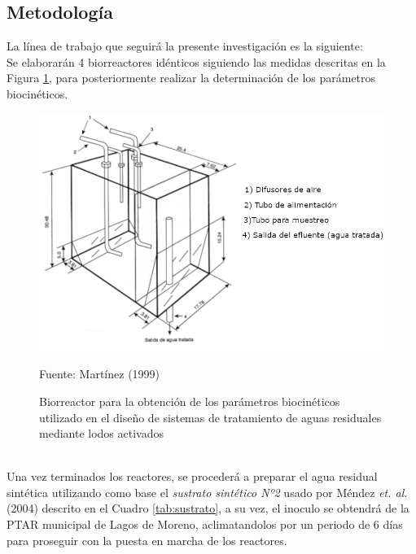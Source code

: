 \subsection*{Metodología}
La línea de trabajo que seguirá la presente investigación es la siguiente:\\
Se elaborarán 4 biorreactores idénticos siguiendo las medidas descritas en la Figura \ref{fig:reactor}, para posteriormente realizar la determinación de los parámetros biocinéticos.
\begin{figure}[!h]
	\centering
	\includegraphics[scale=0.3]{Reactor.png}
	\caption{Biorreactor para la obtención de los parámetros biocinéticos utilizado en el diseño de sistemas de tratamiento de aguas residuales mediante lodos activados}
	\label{fig:reactor}
	\small{Fuente: Martínez (1999)}
\end{figure}
\\Una vez terminados los reactores, se procederá a preparar el agua residual sintética utilizando como base el \emph{sustrato sintético Nº2} usado por Méndez \textit{et. al.} (2004) \emph{\citep{mendez2004}} descrito en el Cuadro \ref{tab:sustrato}, a su vez, el inoculo se obtendrá de la PTAR municipal de Lagos de Moreno, aclimatandolos por un periodo de 6 días para proseguir con la puesta en marcha de los reactores.
